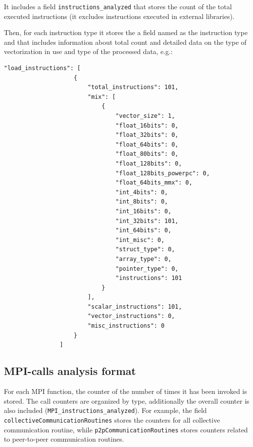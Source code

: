 \documentclass[a4paper, 10pt]{article}
\begin{document}
It includes a field \verb!instructions_analyzed! that stores the count of the total executed instructions
(it excludes instructions executed in external libraries).

Then, for each instruction type it stores the a field named as the instruction type and that includes information about total count and detailed data on
the type of vectorization in use and type of the processed data, e.g.:

\begin{Verbatim}[obeytabs, tabsize=2, frame=lines]
				"load_instructions": [
					{
						"total_instructions": 101,
						"mix": [
							{
								"vector_size": 1,
								"float_16bits": 0,
								"float_32bits": 0,
								"float_64bits": 0,
								"float_80bits": 0,
								"float_128bits": 0,
								"float_128bits_powerpc": 0,
								"float_64bits_mmx": 0,
								"int_4bits": 0,
								"int_8bits": 0,
								"int_16bits": 0,
								"int_32bits": 101,
								"int_64bits": 0,
								"int_misc": 0,
								"struct_type": 0,
								"array_type": 0,
								"pointer_type": 0,
								"instructions": 101
							}
						],
						"scalar_instructions": 101,
						"vector_instructions": 0,
						"misc_instructions": 0
					}
				]
\end{Verbatim}

\subsection{MPI-calls analysis format}
\label{sec:pisaMPI}

For each MPI function, the counter of the number of times it has been invoked is stored.
The call counters are organized by type, additionally the overall counter is also included (\verb!MPI_instructions_analyzed!).
For example, the field \verb!collectiveCommunicationRoutines! stores the counters for all collective communication routine,
while \verb!p2pCommunicationRoutines! stores counters related to peer-to-peer communication routines.
\end{document}

